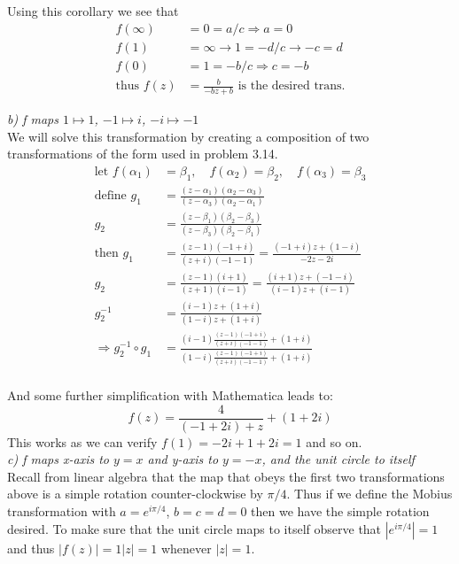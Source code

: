\documentclass[a4paper, 11pt]{article}
\begin{document}
	\noindent Using this corollary we see that
		\begin{align*}
			f(\infty) &= 0 = a/c \Rightarrow a = 0 \\ 
			f(1) &= \infty \rightarrow 1 = -d/c \rightarrow -c =d \\
			f(0) &= 1 = -b/c \Rightarrow c = -b \\ 
			\text{thus } f(z) &= \frac{b}{-bz+b} \text{ is the desired trans.}
		\end{align*}
	
	\noindent \textit{b) f maps $1\mapsto1$, $-1\mapsto i$, $-i \mapsto -1$} \\ 
	
	\noindent We will solve this transformation by creating a composition of two transformations of the form used in problem 3.14. 
		\begin{align*}
			\text{let } f(\alpha_1)&= \beta_1, \quad f(\alpha_2)=\beta_2, \quad f(\alpha_3) = \beta_3 \\ 
			\text{define } g_1 &= \frac{(z-\alpha_1)(\alpha_2-\alpha_3)}{(z-\alpha_3)(\alpha_2-\alpha_1)} \\ 
				g_2 &= \frac{(z-\beta_1)(\beta_2-\beta_3)}{(z-\beta_3)(\beta_2-\beta_1)}\\ 
			\text{then } g_1 &= \frac{(z-1)(-1+i)}{(z+i)(-1-1)} = \frac{(-1+i)z+(1-i)}{-2z-2i} \\ 
				g_2 &= \frac{(z-1)(i+1)}{(z+1)(i-1)} = \frac{(i+1)z+(-1-i)}{(i-1)z+(i-1)} \\ 
				g_2^{-1} &= \frac{(i-1)z+(1+i)}{(1-i)z+(1+i)} \\ 
			\Rightarrow g_2^{-1}\circ g_1 &=  \frac{(i-1)\frac{(z-1)(-1+i)}{(z+i)(-1-1)}+(1+i)}{(1-i)\frac{(z-1)(-1+i)}{(z+i)(-1-1)}+(1+i)} \\ 
		\end{align*}
	
	\noindent And some further simplification with Mathematica leads to: 
		\begin{equation*}
			f(z) = \frac{4}{(-1+2i)+z}+(1+2i)
		\end{equation*}
	\noindent This works as we can verify $f(1)= -2i+1+2i = 1$ and so on. \\
	
	
	\noindent\textit{c) f maps x-axis to $y=x$ and y-axis to $y=-x$, and the unit circle to itself}		\\
		
	\noindent Recall from linear algebra that the map that obeys the first two transformations above is a simple rotation counter-clockwise by $\pi/4$. Thus if we define the Mobius transformation with $a=e^{i\pi/4}$, $b=c=d=0$ then we have the simple rotation desired. To make sure that the unit circle maps to itself observe that $|e^{i\pi/4}|=1$ and thus $|f(z)|=1|z| = 1$ whenever $|z|=1$. 
		
		
		
		
		
		
		
		
		
		
		
		
		
\end{document}
